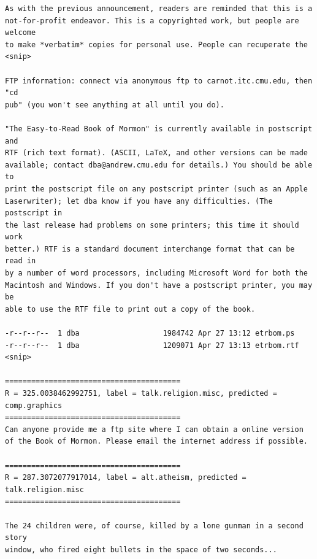 \documentclass{article}
\begin{document}
\begin{enumerate}[start=1]
\begin{Verbatim}
As with the previous announcement, readers are reminded that this is a
not-for-profit endeavor. This is a copyrighted work, but people are welcome
to make *verbatim* copies for personal use. People can recuperate the
<snip>

FTP information: connect via anonymous ftp to carnot.itc.cmu.edu, then "cd
pub" (you won't see anything at all until you do).

"The Easy-to-Read Book of Mormon" is currently available in postscript and
RTF (rich text format). (ASCII, LaTeX, and other versions can be made
available; contact dba@andrew.cmu.edu for details.) You should be able to
print the postscript file on any postscript printer (such as an Apple
Laserwriter); let dba know if you have any difficulties. (The postscript in
the last release had problems on some printers; this time it should work
better.) RTF is a standard document interchange format that can be read in
by a number of word processors, including Microsoft Word for both the
Macintosh and Windows. If you don't have a postscript printer, you may be
able to use the RTF file to print out a copy of the book.

-r--r--r--  1 dba                   1984742 Apr 27 13:12 etrbom.ps
-r--r--r--  1 dba                   1209071 Apr 27 13:13 etrbom.rtf
<snip>

========================================
R = 325.0038462992751, label = talk.religion.misc, predicted = comp.graphics
========================================
Can anyone provide me a ftp site where I can obtain a online version
of the Book of Mormon. Please email the internet address if possible.

========================================
R = 287.3072077917014, label = alt.atheism, predicted = talk.religion.misc
========================================

The 24 children were, of course, killed by a lone gunman in a second story
window, who fired eight bullets in the space of two seconds...
    \end{Verbatim}


\end{enumerate}
\end{document}
